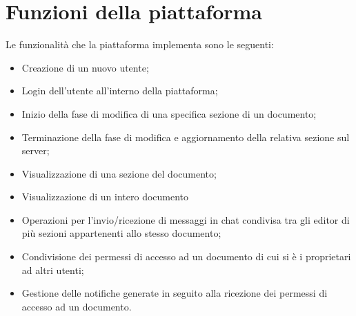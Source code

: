 \section{Funzioni della piattaforma}
Le funzionalità che la piattaforma implementa sono le seguenti:
\begin{itemize}
	\item Creazione di un nuovo utente;
	\item Login dell'utente all'interno della piattaforma;
	\item Inizio della fase di modifica di una specifica sezione di un documento;
	\item Terminazione della fase di modifica e aggiornamento della relativa sezione sul server;
	\item Visualizzazione di una sezione del documento;
	\item Visualizzazione di un intero documento
	\item Operazioni per l'invio/ricezione di messaggi in chat condivisa tra gli editor di più sezioni appartenenti allo stesso documento;
	\item Condivisione dei permessi di accesso ad un documento di cui si è i proprietari ad altri utenti;
	\item Gestione delle notifiche generate in seguito alla ricezione dei permessi di accesso ad un documento.
\end{itemize}